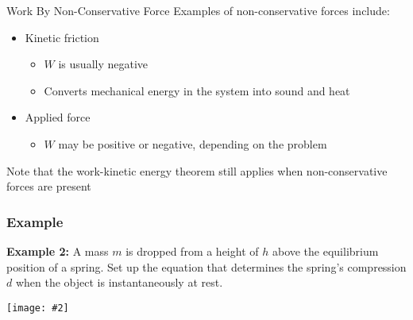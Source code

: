 \documentclass[12pt,compress,aspectratio=169]{beamer}
\newcommand{\pic}[2]{\texttt{[image: \#2]}}
\begin{document}
\begin{frame}{Work By Non-Conservative Force}
  Examples of non-conservative forces include:
  \begin{itemize}
  \item Kinetic friction
    \begin{itemize}
    \item $W$ is usually negative
    \item Converts mechanical energy in the system into sound and heat
    \end{itemize}
  \item Applied force
    \begin{itemize}
    \item $W$ may be positive or negative, depending on the problem
    \end{itemize}
  \end{itemize}
  Note that the work-kinetic energy theorem still applies when non-conservative
  forces are present
\end{frame}


\begin{frame}
  \frametitle{Example}
  \textbf{Example 2:} A mass $m$ is dropped from a height of $h$ above the
  equilibrium position of a spring. Set up the equation that determines the
  spring's compression $d$ when the object is instantaneously at rest.
  \begin{center}
    \pic{.35}{spring-example1.png}
  \end{center}
\end{frame}


\end{document}
